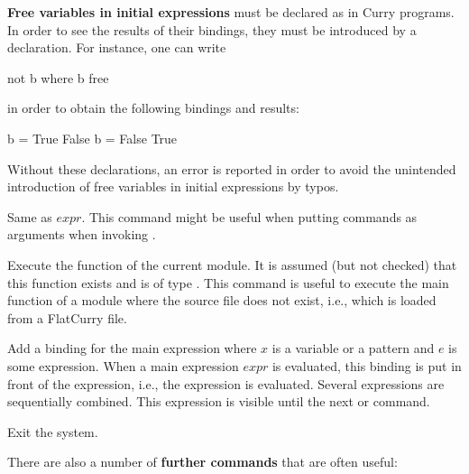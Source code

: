 \begin{description}
\textbf{Free variables in initial expressions} must be declared as
in Curry programs.
In order to see the results of their bindings,
they must be introduced by a  declaration.
For instance, one can write
\begin{curry}
not b where b free
\end{curry}
in order to obtain the following bindings and results:
\begin{curry}
{b = True} False
{b = False} True
\end{curry}
Without these declarations, an error is reported in order to
avoid the unintended introduction of free variables in initial expressions
by typos.

\item[\fbox{:eval $expr$}]
Same as $expr$. This command might be useful when putting
commands as arguments when invoking .

\item[\fbox{:main}]
Execute the function  of the current module.
It is assumed (but not checked) that this function exists and
is of type .
This command is useful to execute the main function of a module
where the source file does not exist, i.e., which is loaded from
a FlatCurry file.

\item[\fbox{let $x$ = $e$}]
Add a  binding for the main expression
where $x$ is a variable or a pattern and $e$ is some expression.
When a main expression $expr$ is evaluated, this  binding
is put in front of the expression,
i.e., the expression 
is evaluated. Several  expressions are sequentially combined.
This  expression is visible
until the next  or  command.

\item[\fbox{\code{:quit}}] Exit the system.
\end{description}
%
\bigskip
%
There are also a number of {\bf further commands} that are often
useful:
%
